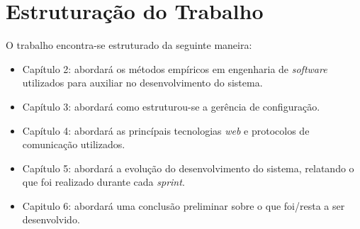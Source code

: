\section{Estruturação do Trabalho}
O trabalho encontra-se estruturado da seguinte maneira:

\begin{itemize}
    \item Capítulo 2: abordará os métodos empíricos em engenharia de \textit{software} utilizados para
    auxiliar no desenvolvimento do sistema.
    \item Capítulo 3: abordará como estruturou-se a gerência de configuração.
    \item Capítulo 4: abordará as princípais tecnologias \textit{web} e protocolos de comunicação utilizados.
    \item Capítulo 5: abordará a evolução do desenvolvimento do sistema, relatando o que foi realizado durante cada \textit{sprint}.
    \item Capitulo 6: abordará uma conclusão preliminar sobre o que foi/resta a ser desenvolvido.
\end{itemize}